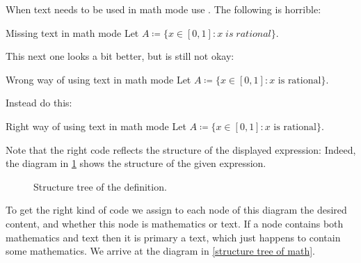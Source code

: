 When text needs to be used in math mode use .
The following is horrible:
\begin{showlatex}{Missing text in math mode}
Let $A \coloneqq \{ x \in [0,1] : x \; is \; rational \}$.
\end{showlatex}
This next one looks a bit better, but is still not okay:
\begin{showlatex}[label = {wrong math mode position}]{Wrong way of using text in math mode}
Let $A \coloneqq \{ x \in [0,1] : x \text{ is rational} \}$.
\end{showlatex}
Instead do this:
\begin{showlatex}[label = {right math mode position}]{Right way of using text in math mode}
Let $A \coloneqq \{ x \in [0,1] : \text{$x$ is rational} \}$.
\end{showlatex}
Note that the right code reflects the structure of the displayed expression:
Indeed, the diagram in \cref{structure tree of definition} shows the structure of the given expression.
\begin{figure}[tb]
  \begin{center}
  \end{center}
  \caption{Structure tree of the definition.}
  \label{structure tree of definition}
\end{figure}
To get the right kind of code we assign to each node of this diagram the desired content, and whether this node is mathematics or text.
If a node contains both mathematics and text then it is primary a text, which just happens to contain some mathematics.
We arrive at the diagram in \cref{structure tree of math}.
